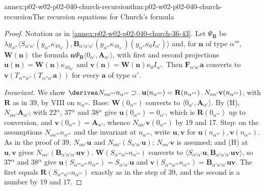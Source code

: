\begin{annexitem}{annex:p02-w02-p02-040-church-recursion}{thm:p02-w02-p02-040-church-recursion}{The recursion equations for Church's formula}
\begin{proof}
Notation as in \cref{annex:p02-w02-p02-040-church-36-43}.  Let \(\Psi_{\mathbf B}\)
be
\(\lambda y_{\alpha''}\langle S_{\alpha'\alpha'}(y_{\alpha''}\kappa_10_{\alpha'}),
\mathbf B_{\alpha'\alpha'\alpha'}(y_{\alpha''}\kappa_10_{\alpha'})(y_{\alpha''}\kappa_0I_{\alpha'})\rangle\)
and, for \(\mathbf n\) of type \(\alpha'''\), \(\mathbf W(\mathbf n)\) the formula
\(\mathbf n\Psi_{\mathbf B}\langle0_{\alpha'},\mathbf A_{\alpha'}\rangle\), with
first and second projections \(\mathbf u(\mathbf n)=\mathbf W(\mathbf n)\kappa_10_{\alpha'}\)
and \(\mathbf v(\mathbf n)=\mathbf W(\mathbf n)\kappa_0I_{\alpha'}\).  Then
\(\mathbf F_{\alpha'\alpha'}\mathbf a\) converts to
\(\mathbf v(T_{\alpha'''\alpha''}(T_{\alpha''\alpha'}\mathbf a))\) for every
\(\mathbf a\) of type \(\alpha'\).

\emph{Invariant.}  We show
\(\derives N_{o\alpha'''}n_{\alpha'''}\supset.\,\mathbf u(n_{\alpha'''})=\mathbf R(n_{\alpha'''})\,.\,N_{o\alpha'}\mathbf v(n_{\alpha'''})\),
with \(\mathbf R\) as in 39, by VIII on \(n_{\alpha'''}\).  Base:
\(\mathbf W(0_{\alpha'''})\) converts to \(\langle0_{\alpha'},\mathbf A_{\alpha'}\rangle\).
By (H), \(N_{o\alpha'}\mathbf A_{\alpha'}\); with 22\(^\alpha\), 37\(^\alpha\) and
38\(^\alpha\) give \(\mathbf u(0_{\alpha'''})=0_{\alpha'}\), which is
\(\mathbf R(0_{\alpha'''})\) up to conversion, and
\(\mathbf v(0_{\alpha'''})=\mathbf A_{\alpha'}\), whence
\(N_{o\alpha'}\mathbf v(0_{\alpha'''})\) by 19 and 17.  Step: on the assumptions
\(N_{o\alpha'''}n_{\alpha'''}\) and the invariant at \(n_{\alpha'''}\), write
\(\mathbf u,\mathbf v\) for \(\mathbf u(n_{\alpha'''}),\mathbf v(n_{\alpha'''})\).
As in the proof of 39, \(N_{o\alpha'}\mathbf u\) and
\(N_{o\alpha'}(S_{\alpha'\alpha'}\mathbf u)\); \(N_{o\alpha'}\mathbf v\) is assumed;
and (H) at \(\mathbf u,\mathbf v\) gives \(N_{o\alpha'}(\mathbf B_{\alpha'\alpha'\alpha'}\mathbf u\mathbf v)\).
\(\mathbf W(S_{\alpha'''\alpha'''}n_{\alpha'''})\) converts to
\(\langle S_{\alpha'\alpha'}\mathbf u,\mathbf B_{\alpha'\alpha'\alpha'}\mathbf u\mathbf v\rangle\),
so 37\(^\alpha\) and 38\(^\alpha\) give
\(\mathbf u(S_{\alpha'''\alpha'''}n_{\alpha'''})=S_{\alpha'\alpha'}\mathbf u\) and
\(\mathbf v(S_{\alpha'''\alpha'''}n_{\alpha'''})=\mathbf B_{\alpha'\alpha'\alpha'}\mathbf u\mathbf v\).
The first equals \(\mathbf R(S_{\alpha'''\alpha'''}n_{\alpha'''})\) exactly as in
the step of 39, and the second is a number by 19 and 17.


\end{proof}
\end{annexitem}
